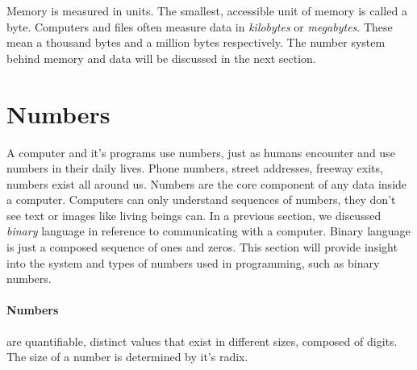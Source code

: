 Memory is measured in units. The smallest, accessible unit of memory is called a byte. Computers and files often measure data in \textit{kilobytes} or \textit{megabytes}. These mean a thousand bytes and a million bytes respectively. The number system behind memory and data will be discussed in the next section.

\section{Numbers}

A computer and it's programs use numbers, just as humans encounter and use numbers in their daily lives. Phone numbers, street addresses, freeway exits, numbers exist all around us. Numbers are the core component of any data inside a computer. Computers can only understand sequences of numbers, they don't see text or images like living beings can. In a previous section, we discussed \textit{binary} language in reference to communicating with a computer. Binary language is just a composed sequence of ones and zeros. This section will provide insight into the system and types of numbers used in programming, such as binary numbers.

\paragraph{Numbers} are quantifiable, distinct values that exist in different sizes, composed of digits. The size of a number is determined by it's radix. 
